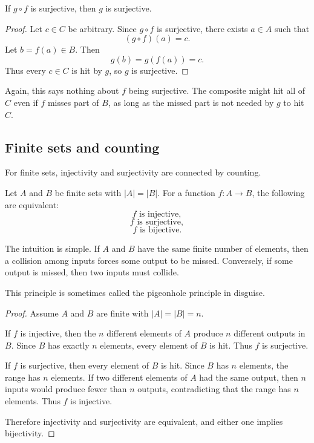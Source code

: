 \begin{theorem}
If $g\circ f$ is surjective, then $g$ is surjective.
\end{theorem}

\begin{proof}
Let $c\in C$ be arbitrary. Since $g\circ f$ is surjective, there exists $a\in A$ such that
\[
(g\circ f)(a)=c.
\]
Let $b=f(a)\in B$. Then
\[
g(b)=g(f(a))=c.
\]
Thus every $c\in C$ is hit by $g$, so $g$ is surjective.
\end{proof}

Again, this says nothing about $f$ being surjective. The composite might hit all of $C$ even if $f$ misses part of $B$, as long as the missed part is not needed by $g$ to hit $C$.

\subsection{Finite sets and counting}

For finite sets, injectivity and surjectivity are connected by counting.

\begin{theorem}
Let $A$ and $B$ be finite sets with $|A|=|B|$. For a function $f:A\to B$, the following are equivalent:
\[
f\text{ is injective},
\]
\[
f\text{ is surjective},
\]
\[
f\text{ is bijective}.
\]
\end{theorem}

The intuition is simple. If $A$ and $B$ have the same finite number of elements, then a collision among inputs forces some output to be missed. Conversely, if some output is missed, then two inputs must collide.

This principle is sometimes called the pigeonhole principle in disguise.

\begin{proof}
Assume $A$ and $B$ are finite with $|A|=|B|=n$.

If $f$ is injective, then the $n$ different elements of $A$ produce $n$ different outputs in $B$. Since $B$ has exactly $n$ elements, every element of $B$ is hit. Thus $f$ is surjective.

If $f$ is surjective, then every element of $B$ is hit. Since $B$ has $n$ elements, the range has $n$ elements. If two different elements of $A$ had the same output, then $n$ inputs would produce fewer than $n$ outputs, contradicting that the range has $n$ elements. Thus $f$ is injective.

Therefore injectivity and surjectivity are equivalent, and either one implies bijectivity.
\end{proof}

